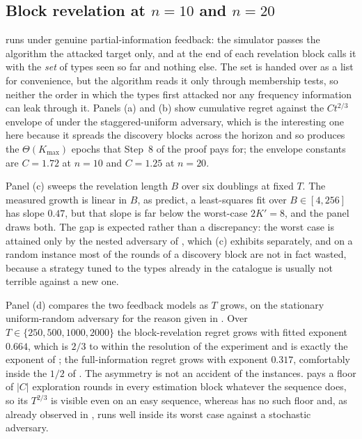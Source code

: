 \documentclass[letterpaper,9pt,twocolumn]{extarticle}
\newcommand{\Kmax}{K_{\max}}
\theoremstyle{plain}
\theoremstyle{definition}
\theoremstyle{remark}
\begin{document}
\subsection{Block revelation at $n=10$ and $n=20$}
\label{sec:exp-block}

 runs  under genuine partial-information
feedback: the simulator passes the algorithm the attacked target only, and at
the end of each revelation block calls it with the \emph{set} of types seen
so far and nothing else. The set is handed over as a list for convenience,
but the algorithm reads it only through membership tests, so neither the
order in which the types first attacked nor any frequency information can
leak through it. Panels (a) and (b) show cumulative regret against
the $Ct^{2/3}$ envelope of  under the staggered-uniform
adversary, which is the interesting one here because it spreads the discovery
blocks across the horizon and so produces the $\Theta(\Kmax)$ epochs that
Step~8 of the proof pays for; the envelope constants are $C=1.72$ at $n=10$
and $C=1.25$ at $n=20$.

Panel (c) sweeps the revelation length $B$ over six doublings at fixed $T$.
The measured growth is linear in $B$, as 
predict, a least-squares fit over $B\in[4,256]$ has slope $0.47$, but
that slope is far below the worst-case $2K'=8$, and the panel draws both.
The gap is expected rather than a discrepancy: the worst case is attained
only by the nested adversary of , which
(c) exhibits separately, and on a random instance most
of the rounds of a discovery block are not in fact wasted, because a strategy
tuned to the types already in the catalogue is usually not terrible against a
new one.

Panel (d) compares the two feedback models as $T$ grows, on the stationary
uniform-random adversary for the reason given in . Over
$T\in\{250,500,1000,2000\}$ the block-revelation regret grows with fitted
exponent $0.664$, which is $2/3$ to within the resolution of the experiment
and is exactly the exponent of ; the full-information regret
grows with exponent $0.317$, comfortably inside the $1/2$ of .
The asymmetry is not an accident of the instances.  pays a
floor of $|C|$ exploration rounds in every estimation block whatever the
sequence does, so its $T^{2/3}$ is visible even on an easy sequence, whereas
 has no such floor and, as already observed in ,
runs well inside its worst case against a stochastic adversary.
\end{document}
